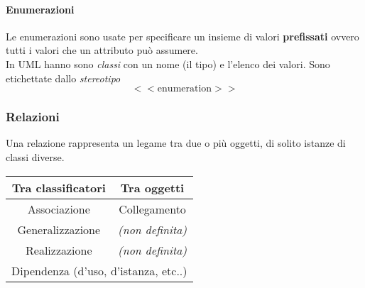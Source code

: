 \paragraph{Enumerazioni} Le enumerazioni sono usate per specificare un insieme di valori \textbf{prefissati} ovvero tutti i valori che un attributo può assumere.\\
In UML hanno sono \textit{classi} con un nome (il tipo) e l'elenco dei valori. Sono etichettate dallo \textit{stereotipo}
\begin{equation*}
	<<\text{enumeration}>>
\end{equation*}

\subsubsection{Relazioni}
Una relazione rappresenta un legame tra due o più oggetti, di solito istanze di classi diverse.

\begin{table}[!h]
	\centering
	\begin{tabular}{|c|c|}
		\hline
		\textbf{Tra classificatori} & \textbf{Tra oggetti}\\
		\hline
		Associazione & Collegamento \\
		\hline
		Generalizzazione & \textit{(non definita)} \\
		\hline
		Realizzazione & \textit{(non definita)} \\
		\hline
		\multicolumn{2}{|c|}{Dipendenza (d'uso, d'istanza, etc..)}\\
		\hline
	\end{tabular}
\end{table}
